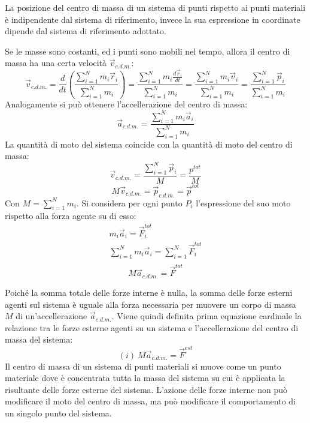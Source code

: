 \documentclass{article}
\numberwithin{equation}{subsection}
\begin{document}
La posizione del centro di massa di un sistema di punti rispetto ai punti materiali è indipendente dal sistema di riferimento, invece la sua espressione in coordinate 
dipende dal sistema di riferimento adottato. 



Se le masse sono costanti, ed i punti sono mobili nel tempo, 
allora il centro di massa ha una certa velocità $\vec{v}_{c.d.m.}$:
\begin{equation}
    \vec{v}_{c.d.m.}=\frac{d}{dt}\left(\displaystyle\frac{\sum_{i=1}^{N}m_i\vec{r}_i}{\sum_{i=1}^{N}m_i}\right)=\displaystyle\frac{\sum_{i=1}^{N}m_i\frac{d\vec{r}_i}{dt}}{\sum_{i=1}^{N}m_i}=\displaystyle\frac{\sum_{i=1}^{N}m_i\vec{v}_i}{\sum_{i=1}^{N}m_i}=\displaystyle\frac{\sum_{i=1}^{N}\vec{p}_i}{\sum_{i=1}^{N}m_i}
\end{equation}
Analogamente si può ottenere l'accellerazione del centro di 
massa:
\begin{equation}
    \vec{a}_{c.d.m.}=\displaystyle\frac{\sum_{i=1}^{N}m_i\vec{a}_i}{\sum_{i=1}^{N}m_i}
\end{equation}
La quantità di moto del sistema coincide con la quantità di 
moto del centro di massa: 
\begin{equation*}
    \vec{v}_{c.d.m.}=\displaystyle\frac{\sum_{i=1}^{N}\vec{p}_i}{M}=\displaystyle\frac{p^{tot}}{M}
\end{equation*}
\begin{equation}
    M\vec{v}_{c.d.m.}=\vec{p}_{c.d.m.}=\vec{p}^{tot}
\end{equation}
Con $M=\displaystyle\sum_{i=1}^{N}m_i$. 
Si considera per ogni punto $P_i$ l'espressione del suo moto rispetto alla forza agente su di esso: 
\begin{gather*}
    m_i\vec{a}_i=\vec{F}_i^{tot}\\
    \displaystyle\sum_{i=1}^{N}m_i\vec{a}_i=\sum_{i=1}^{N}\vec{F}_i^{tot}\\
\end{gather*}
\begin{equation}
    M\vec{a}_{c.d.m.}=\vec{F}^{tot}
\end{equation}


Poiché la somma totale delle forze interne è nulla, la somma 
delle forze esterni agenti sul 
sistema è uguale alla forza necessaria per muovere un corpo 
di massa $M$ di un'accellerazione $\vec{a}_{c.d.m.}$.
Viene quindi definita prima equazione cardinale la relazione tra le forze esterne agenti su un sistema e l'accellerazione del centro di massa del sistema: 
\begin{equation*}
    (i)\:M\vec{a}_{c.d.m.}=\vec{F}^{est}
\end{equation*}
Il centro di massa di un sistema di punti materiali si muove come un punto materiale dove è concentrata tutta la massa del sistema su cui è applicata la risultante delle forze 
esterne del sistema. L'azione delle forze interne non può modificare il moto del centro di massa, ma può modificare il comportamento di un singolo punto del sistema. 
\end{document}

